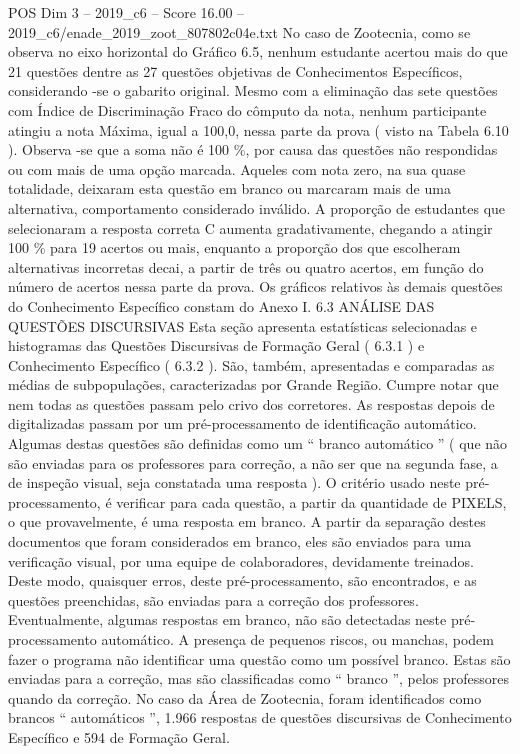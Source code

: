 \begin{textsample}{POS Dim 3 – 2019\_c6 – Score 16.00 – 2019\_c6/enade\_2019\_zoot\_807802c04e.txt}
No caso de Zootecnia, como se observa no eixo horizontal do Gráfico 6.5, nenhum estudante acertou mais do que 21 questões dentre as 27 questões objetivas de Conhecimentos Específicos, considerando -se o gabarito original.
Mesmo com a eliminação das sete questões com Índice de Discriminação Fraco do cômputo da nota, nenhum participante atingiu a nota Máxima, igual a 100,0, nessa parte da prova ( visto na Tabela 6.10 ).
Observa -se que a soma não é 100 \%, por causa das questões não respondidas ou com mais de uma opção marcada.
Aqueles com nota zero, na sua quase totalidade, deixaram esta questão em branco ou marcaram mais de uma alternativa, comportamento considerado inválido.
A proporção de estudantes que selecionaram a resposta correta C aumenta gradativamente, chegando a atingir 100 \% para 19 acertos ou mais, enquanto a proporção dos que escolheram alternativas incorretas decai, a partir de três ou quatro acertos, em função do número de acertos nessa parte da prova.
Os gráficos relativos às demais questões do Conhecimento Específico constam do Anexo I. 6.3 ANÁLISE DAS QUESTÕES DISCURSIVAS Esta seção apresenta estatísticas selecionadas e histogramas das Questões Discursivas de Formação Geral ( 6.3.1 ) e Conhecimento Específico ( 6.3.2 ).
São, também, apresentadas e comparadas as médias de subpopulações, caracterizadas por Grande Região.
Cumpre notar que nem todas as questões passam pelo crivo dos corretores.
As respostas depois de digitalizadas passam por um pré-processamento de identificação automático.
Algumas destas questões são definidas como um “ branco automático ” ( que não são enviadas para os professores para correção, a não ser que na segunda fase, a de inspeção visual, seja constatada uma resposta ).
O critério usado neste pré-processamento, é verificar para cada questão, a partir da quantidade de PIXELS, o que provavelmente, é uma resposta em branco.
A partir da separação destes documentos que foram considerados em branco, eles são enviados para uma verificação visual, por uma equipe de colaboradores, devidamente treinados.
Deste modo, quaisquer erros, deste pré-processamento, são encontrados, e as questões preenchidas, são enviadas para a correção dos professores.
Eventualmente, algumas respostas em branco, não são detectadas neste pré-processamento automático.
A presença de pequenos riscos, ou manchas, podem fazer o programa não identificar uma questão como um possível branco.
Estas são enviadas para a correção, mas são classificadas como “ branco ”, pelos professores quando da correção.
No caso da Área de Zootecnia, foram identificados como brancos “ automáticos ”, 1.966 respostas de questões discursivas de Conhecimento Específico e 594 de Formação Geral.

\end{textsample}
